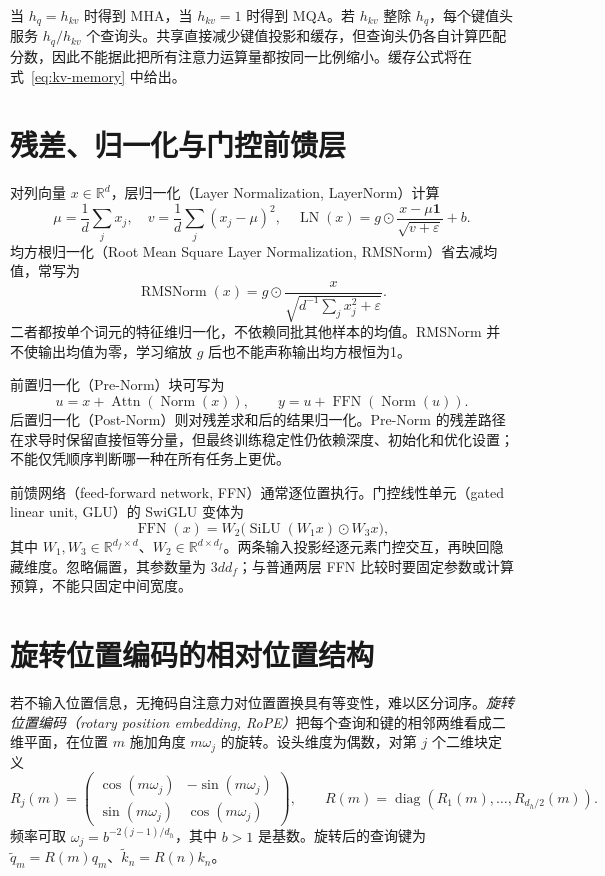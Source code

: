 当 $h_q=h_{kv}$ 时得到 MHA，当 $h_{kv}=1$ 时得到 MQA。若 $h_{kv}$ 整除 $h_q$，每个键值头服务 $h_q/h_{kv}$ 个查询头。共享直接减少键值投影和缓存，但查询头仍各自计算匹配分数，因此不能据此把所有注意力运算量都按同一比例缩小。缓存公式将在式~\eqref{eq:kv-memory} 中给出。

\section{残差、归一化与门控前馈层}

对列向量 $x\in\mathbb R^d$，层归一化（Layer Normalization, LayerNorm）计算
\[
\mu=\frac1d\sum_jx_j,\quad v=\frac1d\sum_j(x_j-\mu)^2,\quad
\operatorname{LN}(x)=g\odot\frac{x-\mu\mathbf1}{\sqrt{v+\varepsilon}}+b.
\]
均方根归一化（Root Mean Square Layer Normalization, RMSNorm）省去减均值，常写为
\[
\operatorname{RMSNorm}(x)=g\odot\frac{x}{\sqrt{d^{-1}\sum_jx_j^2+\varepsilon}}.
\]
二者都按单个词元的特征维归一化，不依赖同批其他样本的均值。RMSNorm 并不使输出均值为零，学习缩放 $g$ 后也不能声称输出均方根恒为1\cite{rmsnorm}。

前置归一化（Pre-Norm）块可写为
\[
u=x+\operatorname{Attn}(\operatorname{Norm}(x)),\qquad
y=u+\operatorname{FFN}(\operatorname{Norm}(u)).
\]
后置归一化（Post-Norm）则对残差求和后的结果归一化。Pre-Norm 的残差路径在求导时保留直接恒等分量，但最终训练稳定性仍依赖深度、初始化和优化设置；不能仅凭顺序判断哪一种在所有任务上更优。

前馈网络（feed-forward network, FFN）通常逐位置执行。门控线性单元（gated linear unit, GLU）的 SwiGLU 变体为
\begin{equation}
\operatorname{FFN}(x)=W_2\bigl(\operatorname{SiLU}(W_1x)\odot W_3x\bigr),
\label{eq:swiglu}
\end{equation}
其中 $W_1,W_3\in\mathbb R^{d_f\times d}$、$W_2\in\mathbb R^{d\times d_f}$。两条输入投影经逐元素门控交互，再映回隐藏维度\cite{swiglu}。忽略偏置，其参数量为 $3dd_f$；与普通两层 FFN 比较时要固定参数或计算预算，不能只固定中间宽度。

\section{旋转位置编码的相对位置结构}

若不输入位置信息，无掩码自注意力对位置置换具有等变性，难以区分词序。\emph{旋转位置编码（rotary position embedding, RoPE）}把每个查询和键的相邻两维看成二维平面，在位置 $m$ 施加角度 $m\omega_j$ 的旋转\cite{rope}。设头维度为偶数，对第 $j$ 个二维块定义
\[
R_j(m)=\begin{pmatrix}\cos(m\omega_j)&-\sin(m\omega_j)\\
\sin(m\omega_j)&\cos(m\omega_j)\end{pmatrix},
\qquad R(m)=\operatorname{diag}(R_1(m),\ldots,R_{d_h/2}(m)).
\]
频率可取 $\omega_j=b^{-2(j-1)/d_h}$，其中 $b>1$ 是基数。旋转后的查询键为 $\widetilde q_m=R(m)q_m$、$\widetilde k_n=R(n)k_n$。

